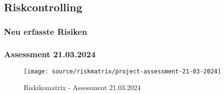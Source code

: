 
\begin{flushleft}
    \begin{landscape}
        \subsection{Riskcontrolling}
        \subsubsection{Neu erfasste Risiken}
        
    \end{landscape}
\end{flushleft}
\begin{flushleft}
    \begin{landscape}
        \subsubsection{Assessment 21.03.2024}
        
    \end{landscape}
    \begin{figure}[H]
        \centering
        \texttt{[image: source/riskmatrix/project-assessment-21-03-2024]}
        \caption{Riskikomatrix - Assessment 21.03.2024}
        \label{fig:project-assessment-21-03-2024}
    \end{figure}
\end{flushleft}